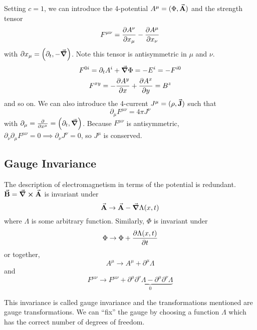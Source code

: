 \documentclass[a4paper,twoside,master.tex]{subfiles}
\begin{document}
Setting $ c = 1 $, we can introduce the 4-potential $ A^{\mu} = (\Phi, \va{A}) $ and the strength tensor
\begin{equation}
    F^{\mu \nu} = \pdv{A^{\nu}}{x_{\mu}} - \pdv{A^{\mu}}{x_{\nu}}
\end{equation}
with $ \partial{x_{\mu}} = \left( \partial_t, - \grad \right) $. Note this tensor is antisymmetric in $ \mu $ and $ \nu $.
\begin{equation}
    F^{0i} = \partial_t A^i + \grad{\Phi} = - E^i = - F^{i0}
\end{equation}
\begin{equation}
    F^{xy} = - \pdv{A^y}{x} + \pdv{A^x}{y} = B^z
\end{equation}
and so on. We can also introduce the 4-current $ J^{\mu} = (\rho, \va{J}) $ such that
\begin{equation}
    \partial_{\mu} F^{\mu \nu} = 4 \pi J^{\nu}
\end{equation}
with $ \partial_{\mu} = \pdv{x^{\mu}} = \left( \partial_t, \grad \right) $. Because $ F^{\mu \nu} $ is antisymmetric, $ \partial_{\nu} \partial_{\mu} F^{\mu \nu} = 0 \implies \partial_{\nu} J^{\nu} = 0 $, so $ J^{\mu} $ is conserved.

\subsection{Gauge Invariance}\label{sub:gauge_invariance}

The description of electromagnetism in terms of the potential is redundant. $ \va{B} = \curl{\va{A}} $ is invariant under
\begin{equation}
    \va{A} \to \va{A} - \grad{\Lambda(x, t)}
\end{equation}
where $ \Lambda $ is some arbitrary function. Similarly, $ \Phi $ is invariant under
\begin{equation}
    \Phi \to \Phi + \pdv{\Lambda(x, t)}{t}
\end{equation}
or together,
\begin{equation}
    A^{\mu} \to A^{\mu} + \partial^{\mu} \Lambda
\end{equation}
and
\begin{equation}
    F^{\mu \nu} \to F^{\mu \nu} + \underbrace{\partial^{\mu} \partial^{\nu} \Lambda - \partial^{\mu} \partial^{\nu} \Lambda}_{0}
\end{equation}

This invariance is called gauge invariance and the transformations mentioned are gauge transformations. We can ``fix'' the gauge by choosing a function $ \Lambda $ which has the correct number of degrees of freedom.
\end{document}
